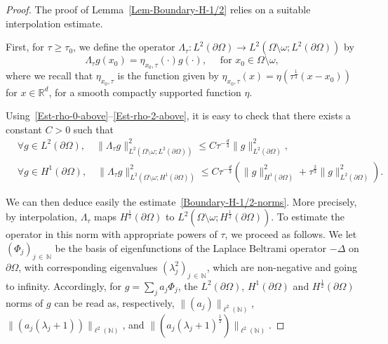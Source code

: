 \documentclass[10pt]{amsart}
\theoremstyle{definition}\newtheorem{defi}[theo]{Definition}\newtheorem{rema}[theo]{Remark}\newtheorem{exam}[theo]{Example}\newtheorem{exem}[theo]{Example}\newtheorem{nota}[theo]{Notation}
\newcommand*\R{\mathbb{R}}
\newcommand*\N{\mathbb{N}}
\renewcommand{\leq}{\leqslant}
\renewcommand{\geq}{\geqslant}
\let\oldforall\forall
\renewcommand*{\forall}{\mathrel{\oldforall}}
\begin{document}
\begin{proof}
The proof of Lemma~\ref{Lem-Boundary-H-1/2} relies on a suitable interpolation estimate.

First, for $\tau \geq \tau_0$, we define the operator $ \Lambda_{\tau}: L^2(\partial \Omega) \to L^2(\Omega\setminus\omega; L^2(\partial\Omega)) $ by
\begin{equation*}
\Lambda_{\tau} g(x_0) = \eta_{x_0, \tau}(\cdot) g (\cdot), \quad \text{ for } x_0 \in \Omega \setminus \omega,
\end{equation*}
where we recall that $\eta_{x_0, \tau}$ is the function given by $\eta_{x_0, \tau} (x) = \eta (\tau^{\frac{1}{3}} (x-x_0))$ for $x \in \R^d$, for a smooth compactly supported function $\eta$.

Using~\eqref{Est-rho-0-above}--\eqref{Est-rho-2-above}, it is easy to check that there exists a constant $C>0$ such that
\begin{align*}
&\forall g \in L^2(\partial \Omega),
\quad
\| \Lambda_\tau g \|_{L^2\left(\Omega\setminus\omega; L^2(\partial\Omega)\right)}^2
\leq C \tau^{-\frac{d}{3}} \|g \|_{L^2(\partial \Omega)}^2,
\\
&\forall g \in H^1(\partial \Omega),
\quad
\| \Lambda_\tau g \|_{L^2\left(\Omega\setminus\omega; H^1(\partial\Omega)\right)}^2
\leq C \tau^{-\frac{d}{3}} \left(\|g \|_{H^1(\partial \Omega)}^2 + \tau^{\frac{2}{3}} \| g \|_{L^2(\partial \Omega)}^2\right).
\end{align*}

We can then deduce easily the estimate~\eqref{Boundary-H-1/2-norms}. More precisely, by interpolation, $\Lambda_\tau$ maps $H^{\frac{1}{2}}(\partial \Omega)$ to $ L^2(\Omega\setminus\omega; H^{\frac{1}{2}}(\partial\Omega))$. To estimate the operator in this norm with appropriate powers of $\tau$, we proceed as follows. We let $(\Phi_j)_{j\, \in\,\N} $ be the basis of eigenfunctions of the Laplace Beltrami operator $-\Delta$ on $\partial \Omega$, with corresponding eigenvalues $(\lambda_j^2)_{j\,\in\,\N}$, which are non-negative and going to infinity. Accordingly, for $g = \sum_j a_j \Phi_j$, the $L^2(\partial \Omega)$, $H^1(\partial \Omega)$ and $H^{\frac{1}{2}}(\partial \Omega)$ norms of $g$ can be read as, respectively, $\| (a_j)\|_{\ell^2(\N)}$, $\|(a_j (\lambda_j +1)) \|_{\ell^2(\N)}$, and $\|(a_j (\lambda_j +1)^{\frac{1}{2}})\|_{\ell^2(\N)}$.


\end{proof}
\end{document}
